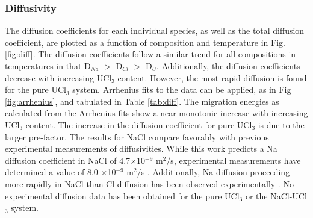 \documentclass[preprint,3p,10pt,onecolumn,number,sort&compress]{elsarticle}
\begin{document}
\FloatBarrier

\subsubsection{Diffusivity}

The diffusion coefficients for each individual species, as well as the total diffusion coefficient, are plotted as a function of composition and temperature in Fig. \ref{fig:diff}. The diffusion coefficients follow a similar trend for all compositions in temperatures in that D$_{Na}$ $>$ D$_{Cl}$ $>$ D$_U$. Additionally, the diffusion coefficients decrease with increasing UCl$_3$ content. However, the most rapid diffusion is found for the pure UCl$_3$ system. Arrhenius fits to the data can be applied, as in Fig \ref{fig:arrhenius}, and tabulated in Table \ref{tab:diff}. The migration energies as calculated from the Arrhenius fits show a near monotonic increase with increasing UCl$_3$ content. The increase in the diffusion coefficient for pure UCl$_3$ is due to the larger pre-factor. The results for NaCl compare favorably with previous experimental measurements of diffusivities. While this work predicts a Na diffusion coefficient in NaCl of 4.7$\times$10$^{-9}$ m$^2$/s, experimental measurements have determined a value of 8.0 $\times$10$^{-9}$ m$^2$/s \cite{janz_diffusion}. Additionally, Na diffusion proceeding more rapidly in NaCl than Cl diffusion has been observed experimentally \cite{janz_diffusion}. No experimental diffusion data has been obtained for the pure UCl$_3$ or the NaCl-UCl$_3$ system. 
\end{document}
